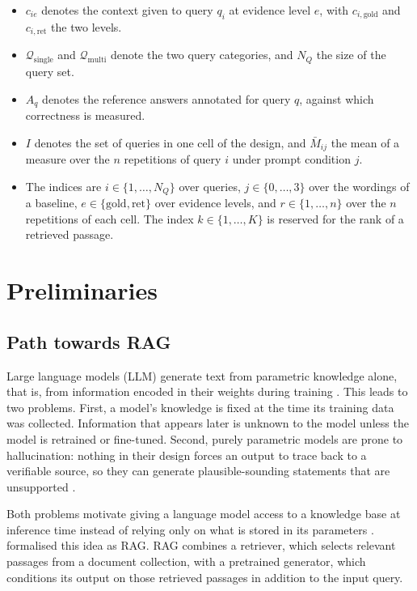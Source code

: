 \documentclass[12pt,a4paper,oneside]{scrreprt}
\begin{document}
\begin{itemize}
    \item $c_{ie}$ denotes the context given to query $q_i$ at evidence level $e$, with $c_{i,\text{gold}}$ and $c_{i,\text{ret}}$ the two levels.
     \item $\mathcal{Q}_{\text{single}}$ and $\mathcal{Q}_{\text{multi}}$ denote the two query categories, and $N_Q$ the size of the query set.
    \item $A_q$ denotes the reference answers annotated for query $q$, against which correctness is measured.
    \item $I$ denotes the set of queries in one cell of the design, and $\bar{M}_{ij}$ the mean of a measure over the $n$ repetitions of query $i$ under prompt condition $j$.
    \item The indices are $i \in \{1,\ldots,N_Q\}$ over queries, $j \in \{0,\ldots,3\}$ over the wordings of a baseline, $e \in \{\text{gold},\text{ret}\}$ over evidence levels, and $r \in \{1,\ldots,n\}$ over the $n$ repetitions of each cell. The index $k \in \{1,\ldots,K\}$ is reserved for the rank of a retrieved passage.
\end{itemize}

\chapter{Preliminaries}



\section{Path towards RAG}
Large language models (LLM) generate text from parametric knowledge alone, that is, from information encoded in their weights during training
\citep{wang2024knowledgemechanisms}. This leads to two problems. First, a model's
knowledge is fixed at the time its training data was collected. Information that appears later is unknown to the model unless the model is retrained or fine-tuned. Second, purely parametric models are prone to
hallucination: nothing in their design forces an output to trace back to a
verifiable source, so they can generate plausible-sounding statements that are unsupported \citep{ji2023hallucination}.

Both problems motivate giving a language model access to a knowledge base at inference time instead of relying only on what
is stored in its parameters \citep{lin2025llminference}. \citet{lewis2020rag}
formalised this idea as RAG. RAG combines a retriever, which selects relevant passages from a document
collection, with a pretrained generator, which conditions its output on those retrieved passages in addition to the input query.
\end{document}
